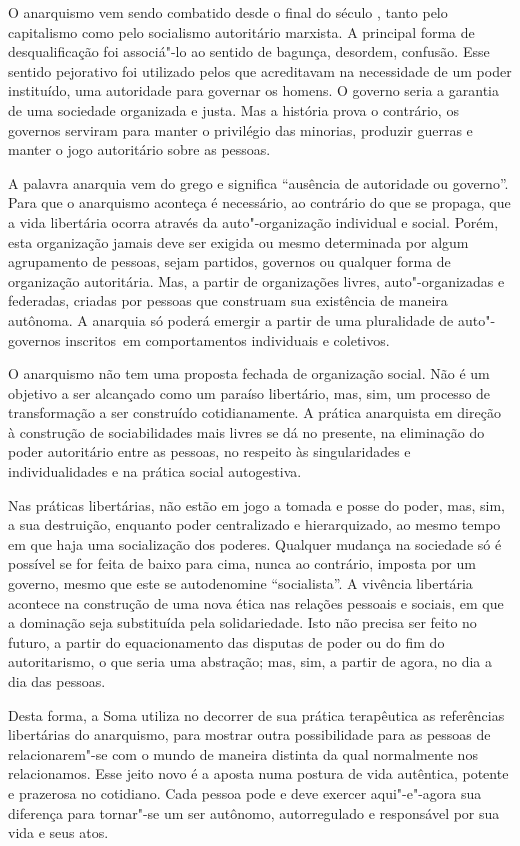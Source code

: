 O anarquismo vem sendo combatido desde o final do século , tanto
pelo capitalismo como pelo socialismo autoritário marxista. A principal
forma de desqualificação foi associá"-lo ao sentido de bagunça, desordem,
confusão. Esse sentido pejorativo foi utilizado pelos que acreditavam na
necessidade de um poder instituído, uma autoridade para governar os
homens. O governo seria a garantia de uma sociedade organizada e justa.
Mas a história prova o contrário, os governos serviram para manter o
privilégio das minorias, produzir guerras e manter o jogo autoritário
sobre as pessoas.

A palavra anarquia vem do grego e significa ``ausência de autoridade ou
governo''. Para que o anarquismo aconteça é necessário, ao contrário do
que se propaga, que a vida libertária ocorra através da auto"-organização
individual e social. Porém, esta organização jamais deve ser exigida ou
mesmo determinada por algum agrupamento de pessoas, sejam partidos,
governos ou qualquer forma de organização autoritária. Mas, a partir de
organizações livres, auto"-organizadas e federadas, criadas por pessoas
que construam sua existência de maneira autônoma. A anarquia só poderá
emergir a partir de uma pluralidade de auto"-governos inscritos~em
comportamentos individuais e coletivos.

O anarquismo não tem uma proposta fechada de organização social. Não é
um objetivo a ser alcançado como um paraíso libertário, mas, sim, um
processo de transformação a ser construído cotidianamente. A prática
anarquista em direção à construção de sociabilidades mais livres se dá no
presente, na eliminação do poder autoritário entre as pessoas, no
respeito às singularidades e individualidades e na prática social
autogestiva.

Nas práticas libertárias, não estão em jogo a tomada e posse do poder,
mas, sim, a sua destruição, enquanto poder centralizado e hierarquizado,
ao mesmo tempo em que haja uma socialização dos poderes. Qualquer
mudança na sociedade só é possível se for feita de baixo para cima,
nunca ao contrário, imposta por um governo, mesmo que este se
autodenomine ``socialista''. A vivência libertária acontece na
construção de uma nova ética nas relações pessoais e sociais, em que a
dominação seja substituída pela solidariedade. Isto não precisa ser
feito no futuro, a partir do equacionamento das disputas de poder ou do
fim do autoritarismo, o que seria uma abstração; mas, sim, a partir de
agora, no dia a dia das pessoas.

Desta forma, a Soma utiliza no decorrer de sua prática terapêutica as
referências libertárias do anarquismo, para mostrar outra possibilidade
para as pessoas de relacionarem"-se com o mundo de maneira distinta da
qual normalmente nos relacionamos. Esse jeito novo é a aposta numa
postura de vida autêntica, potente e prazerosa no cotidiano. Cada pessoa
pode e deve exercer aqui"-e"-agora sua diferença para tornar"-se um ser
autônomo, autorregulado e responsável por sua vida e seus atos.


